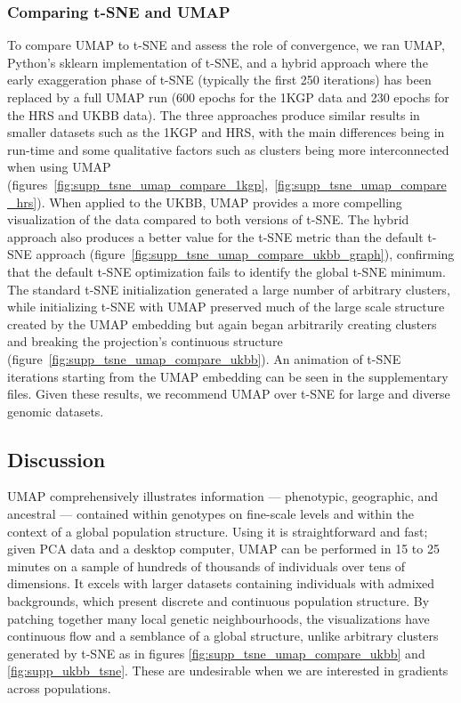\documentclass[12pt]{pnas-new}
\begin{document}
\subsubsection*{Comparing t-SNE and UMAP}
To compare UMAP to t-SNE and assess the role of convergence, we ran UMAP, Python's sklearn implementation of t-SNE, and a hybrid approach where the early exaggeration phase of t-SNE (typically the first 250 iterations) has been replaced by a full UMAP run (600 epochs for the 1KGP data and 230 epochs for the HRS and UKBB data). The three approaches produce similar results in smaller datasets such as the 1KGP and HRS, with the main differences being in run-time and some qualitative factors such as clusters being more interconnected when using UMAP (figures~\ref{fig:supp_tsne_umap_compare_1kgp},~\ref{fig:supp_tsne_umap_compare_hrs}). When applied to the UKBB, UMAP provides a more compelling visualization of the data compared to both versions of t-SNE. The hybrid approach also produces a better value for the t-SNE metric than the default t-SNE approach (figure~\ref{fig:supp_tsne_umap_compare_ukbb_graph}), confirming that the default t-SNE optimization fails to identify the global t-SNE minimum. The standard t-SNE initialization generated a large number of arbitrary clusters, while initializing t-SNE with UMAP preserved much of the large scale structure created by the UMAP embedding but again began arbitrarily creating clusters and breaking the projection's continuous structure (figure~\ref{fig:supp_tsne_umap_compare_ukbb}). An animation of t-SNE iterations starting from the UMAP embedding can be seen in the supplementary files. Given these results, we recommend UMAP over t-SNE for large and diverse genomic datasets.

\subsection*{Discussion}
UMAP comprehensively illustrates information --- phenotypic, geographic, and ancestral --- contained within genotypes on fine-scale levels and within the context of a global population structure. Using it is straightforward and fast; given PCA data and a desktop computer, UMAP can be performed in 15 to 25 minutes on a sample of hundreds of thousands of individuals over tens of dimensions. It excels with larger datasets containing individuals with admixed backgrounds, which present discrete and continuous population structure. By patching together many local genetic neighbourhoods, the visualizations have continuous flow and a semblance of a global structure, unlike arbitrary clusters generated by t-SNE as in figures \ref{fig:supp_tsne_umap_compare_ukbb} and \ref{fig:supp_ukbb_tsne}. These are undesirable when we are interested in gradients across populations.
\end{document}
